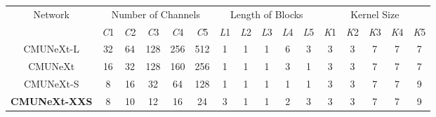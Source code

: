 \begin{tabular}{c|ccccc|ccccc|ccccc}
\toprule[1.1pt]
\multirow{2}{*}[-0.3em]{Network} & 
\multicolumn{5}{c|}{Number of Channels} & 
\multicolumn{5}{c|}{Length of Blocks} & 
\multicolumn{5}{c}{Kernel Size} \\

\cmidrule{2-16}
& \textit{C}1 & \textit{C}2 & \textit{C}3 & \textit{C}4 & \textit{C}5 
& \textit{L}1 & \textit{L}2 & \textit{L}3 & \textit{L}4 & \textit{L}5 
& \textit{K}1 & \textit{K}2 & \textit{K}3 & \textit{K}4 & \textit{K}5 \\
\midrule[1.1pt]
CMUNeXt-L      
& 32 &  64 & 128 & 256 & 512 
& 1  &   1 &   1 &   6 &   3 
& 3  &   3 &   7 &   7 &   7 \\
CMUNeXt        
& 16 &  32 & 128 & 160 & 256 
& 1  &   1 &   1 &   3 &   1 
& 3  &   3 &   7 &   7 &   7 \\
CMUNeXt-S      
&  8 &  16 &  32 &  64 & 128 
& 1  &   1 &   1 &   1 &   1 
& 3  &   3 &   7 &   7 &   9 \\
\midrule[0.7pt]
\textbf{CMUNeXt-XXS} 
&  8 &  10 & 12 & 16 & 24 
&  3 &   1 &  1 &  2 &  3 
&  3 &   3 &  7 &  7 &  9 \\
\bottomrule[1.1pt]
\end{tabular}